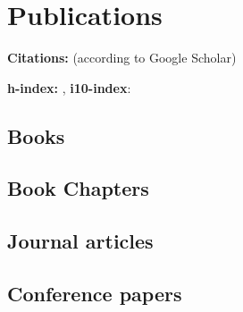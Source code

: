 \section{Publications}

{\bf Citations:} \cvcitations{} (according to Google Scholar)

{\bf h-index:} \cvhindex, {\bf i10-index}: \cvitenindex

\subsection*{Books}
\begin{refsection}

\printbibliography[heading=none]
\end{refsection}

\subsection*{Book Chapters}
\begin{refsection}

\printbibliography[heading=none]
\end{refsection}

\subsection*{Journal articles}
\begin{refsection}

\printbibliography[heading=none]
\end{refsection}

\subsection*{Conference papers}
\begin{refsection}

\printbibliography[heading=none]
\end{refsection}
